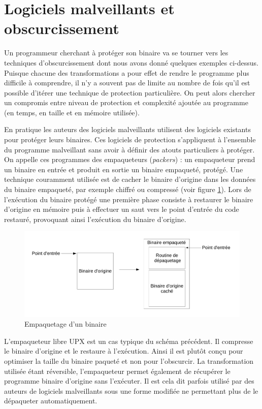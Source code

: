 \section{Logiciels malveillants et obscurcissement}
Un programmeur cherchant à protéger son binaire va se tourner vers les techniques d'obscurcissement dont nous avons donné quelques exemples ci-dessus. Puisque chacune des transformations a pour effet de rendre le programme plus difficile à comprendre, il n'y a souvent pas de limite au nombre de fois qu'il est possible d'itérer une technique de protection particulière. On peut alors chercher un compromis entre niveau de protection et complexité ajoutée au programme (en temps, en taille et en mémoire utilisée).

En pratique les auteurs des logiciels malveillants utilisent des logiciels existants pour protéger leurs binaires.
Ces logiciels de protection s'appliquent à l'ensemble du programme malveillant sans avoir à définir des atouts particuliers à protéger. On appelle ces programmes des empaqueteurs (\emph{packers}) : un empaqueteur prend un binaire en entrée et produit en sortie un binaire empaqueté, protégé. Une technique couramment utilisée est de cacher le binaire d'origine dans les données du binaire empaqueté, par exemple chiffré ou compressé (voir figure \ref{fig:packer}). Lors de l'exécution du binaire protégé une première phase consiste à restaurer le binaire d'origine en mémoire puis à effectuer un saut vers le point d'entrée du code restauré, provoquant ainsi l'exécution du binaire d'origine.

\begin{figure}
\begin{center}
\includegraphics[width=1.0\textwidth]{supports/packers/packers.pdf}
\end{center}
\caption{Empaquetage d'un binaire}
\label{fig:packer}
\end{figure}

L'empaqueteur libre UPX \cite{UPX} est un cas typique du schéma précédent. Il compresse le binaire d'origine et le restaure à l'exécution. Ainsi il est plutôt conçu pour optimiser la taille du binaire paqueté et non pour l'obscurcir. La transformation utilisée étant réversible, l'empaqueteur permet également de récupérer le programme binaire d'origine sans l'exécuter. Il est cela dit parfois utilisé par des auteurs de logiciels malveillants sous une forme modifiée ne permettant plus de le dépaqueter automatiquement.


